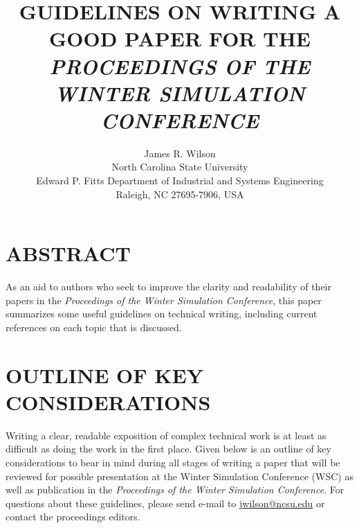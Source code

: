 \documentclass{wscpaperproc}
\theoremstyle{wsc}
\begin{document}
%
%

\title{GUIDELINES ON WRITING A GOOD PAPER FOR THE \\
\textbf{\textit{PROCEEDINGS OF THE  WINTER SIMULATION CONFERENCE}}}

\author{James R. Wilson \\ [12pt]
        North Carolina State University \\
        Edward P. Fitts Department of Industrial and Systems Engineering \\
        Raleigh, NC 27695-7906, USA \\
}

\maketitle
% 

\section*{ABSTRACT}
As an aid to authors who seek to improve the clarity and readability of
their papers in the \textit{Proceedings of the Winter Simulation
Conference}, this paper summarizes some useful guidelines on technical
writing, including current references on each topic that is discussed. 



\section{OUTLINE OF KEY CONSIDERATIONS}
\label{sec:intro}
Writing a clear, readable exposition of complex technical work is at least
as difficult as doing the work in the first place.  Given below is an
outline of key considerations to bear in mind during all stages of writing
a paper that will be reviewed for possible presentation at the Winter
Simulation Conference (WSC) as well as publication in the {\em Proceedings
of the Winter Simulation Conference}.  For questions about these
guidelines, please send e-mail to
\href{mailto:jwilson@ncsu.edu}{jwilson@ncsu.edu} or contact the proceedings
editors.
\end{document}
